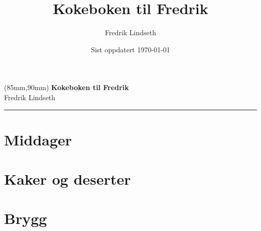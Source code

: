 \documentclass[12pt,a4paper]{book}
\title{Kokeboken til Fredrik}
\author{Fredrik Lindseth}
\date{Sist oppdatert \today}
\begin{document}


\thispagestyle{empty}
\null\newpage

\thispagestyle{empty}
\begin{textblock*}{90mm}(85mm,90mm)
\noindent
{\sffamily\LARGE\bfseries Kokeboken til Fredrik}\\
\noindent
{\sffamily\small Fredrik Lindseth}\\
{\color{dark-gray}\rule[5pt]{220pt}{3pt}}
\end{textblock*}
\null\newpage

% 






\tableofcontents
\clearpage


\setcounter{page}{1}
%

\chapter{Middager}


\chapter{Kaker og deserter}


\chapter{Brygg}


\printindex
\end{document}
